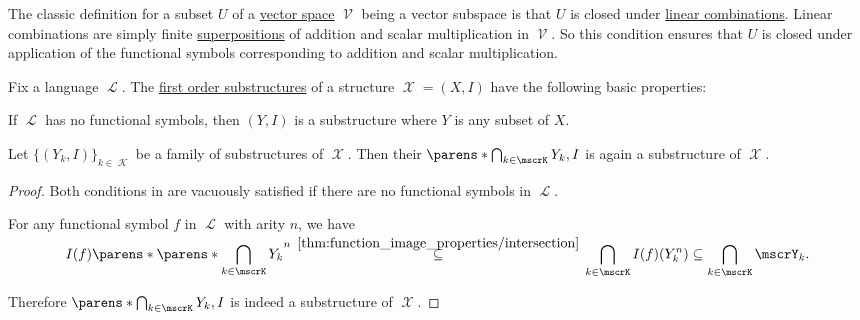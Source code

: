 \begin{example}\label{ex:def:first_order_substructure/vector_space}
  The classic definition for a subset \( U \) of a \hyperref[def:vector_space]{vector space} \( \mscrV \) being a vector subspace is that \( U \) is closed under \hyperref[def:linear_combination]{linear combinations}. Linear combinations are simply finite \hyperref[def:function/superposition]{superpositions} of addition and scalar multiplication in \( \mscrV \). So this condition ensures that \( U \) is closed under application of the functional symbols corresponding to addition and scalar multiplication.
\end{example}

\begin{proposition}\label{thm:first_order_substructure_properties}
  Fix a language \( \mscrL \). The \hyperref[def:first_order_substructure]{first order substructures} of a structure \( \mscrX = (X, I) \) have the following basic properties:
  \begin{thmenum}
     If \( \mscrL \) has no functional symbols, then \( (Y, I) \) is a substructure where \( Y \) is any subset of \( X \).

     Let \( \{ (Y_k, I) \}_{k \in \mscrK} \) be a family of substructures of \( \mscrX \). Then their  \( \parens*{\bigcap_{k \in \mscrK} Y_k, I} \) is again a substructure of \( \mscrX \).
  \end{thmenum}
\end{proposition}
\begin{proof}
   Both conditions in  are vacuously satisfied if there are no functional symbols in \( \mscrL \).

   For any functional symbol \( f \) in \( \mscrL \) with arity \( n \), we have
  \begin{equation*}
    I(f)\parens*{\parens*{\bigcap_{\smash{k \in \mscrK}} Y_k}^n}
    \reloset {\ref{thm:function_image_properties/intersection}} \subseteq
    \bigcap_{k \in \mscrK} I(f)(Y_k^n) \subseteq \bigcap_{k \in \mscrK} \mscrY_k.
  \end{equation*}

  Therefore \( \parens*{\bigcap_{k \in \mscrK} Y_k, I} \) is indeed a substructure of \( \mscrX \).
\end{proof}

